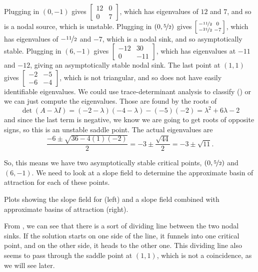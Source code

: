 \documentclass{ximera}
\begin{document}
\begin{exampleSol}
    Plugging in $(0,-1)$ gives 
    $\left[ \begin{smallmatrix} 12 & 0 \\ 0 & 7 \end{smallmatrix} \right]$, 
    which has eigenvalues of $12$ and $7$, and so is a nodal source, which is unstable. Plugging in  
    $\left(0, \nicefrac{5}{2}\right)$ 
    gives 
    $\left[ \begin{smallmatrix} -\nicefrac{11}{2} & 0 \\ -\nicefrac{21}{2} & -7 \end{smallmatrix} \right]$, 
    which has eigenvalues of $-\nicefrac{11}{2}$ and $-7$, which is a nodal sink, and so asymptotically stable. Plugging in $(6,-1)$ gives 
    $\left[ \begin{smallmatrix} -12 & 30 \\ 0 & -11 \end{smallmatrix} \right]$, 
    which has eigenvalues at $-11$ and $-12$, giving an asymptotically stable nodal sink. The last point at $(1,1)$ gives 
    $\left[ \begin{smallmatrix} -2 & -5 \\ -6 & -4 \end{smallmatrix} \right]$, 
    which is not triangular, and so does not have easily identifiable eigenvalues. We could use trace-determinant analysis to classify () or we can just compute the eigenvalues. Those are found by the roots of
    \begin{equation*}
        \det(A - \lambda I) = (-2-\lambda)(-4-\lambda) - (-5)(-2) = \lambda^2 + 6\lambda - 2
    \end{equation*}
    and since the last term is negative, we know we are going to get roots of opposite signs, so this is an unstable saddle point. The actual eigenvalues are
    \begin{equation*}
        \frac{-6 \pm \sqrt{36 - 4(1)(-2)}}{2} = -3 \pm \frac{\sqrt{44}}{2} = -3\pm\sqrt{11}.
    \end{equation*}
    
    So, this means we have two asymptotically stable critical points, $\left(0, \nicefrac{5}{2}\right)$ and $(6, -1)$. We need to look at a slope field to determine the approximate basin of attraction for each of these points.
    
    \begin{myfig}
        \capstart
        \caption{Plots showing the slope field for  (left) and a slope field combined with approximate basins of attraction (right). \label{fig:BoAPlot}}
    \end{myfig}
    
    From , we can see that there is a sort of dividing line between the two nodal sinks. If the solution starts on one side of the line, it funnels into one critical point, and on the other side, it heads to the other one. This dividing line also seems to pass through the saddle point at $(1,1)$, which is not a coincidence, as we will see later. 
\end{exampleSol}
\end{document}
